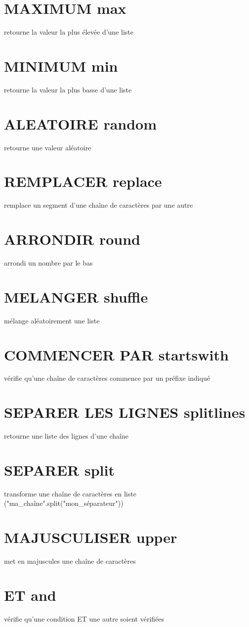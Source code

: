 \documentclass{book}
\begin{document}
\section{MAXIMUM max }
  retourne la valeur la plus élevée d'une liste 
\section{MINIMUM min }
  retourne la valeur la plus basse d'une liste
\section{ALEATOIRE random }
  retourne une valeur aléatoire
\section{REMPLACER replace }
  remplace un segment d'une chaîne de caractères par une autre
\section{ARRONDIR round }
  arrondi un nombre par le bas
\section{MELANGER shuffle }
  mélange aléatoirement une liste
\section{COMMENCER PAR startswith }
  vérifie qu'une chaîne de caractères commence par un préfixe indiqué
\section{SEPARER LES LIGNES splitlines }
  retourne une liste des lignes d'une chaîne
\section{SEPARER split }
  transforme une chaîne de caractères en liste ("ma\_chaîne".split("mon\_séparateur"))
\section{MAJUSCULISER upper }
  met en majuscules une chaîne de caractères
\section{ET and }
  vérifie qu'une condition ET une autre soient vérifiées
\end{document}
